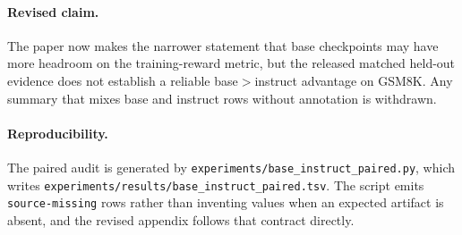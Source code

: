 \paragraph{Revised claim.}
The paper now makes the narrower statement that base checkpoints may have
more headroom on the training-reward metric, but the released matched
held-out evidence does not establish a reliable base$>$instruct advantage on
GSM8K. Any summary that mixes base and instruct rows without annotation is
withdrawn.

\paragraph{Reproducibility.}
The paired audit is generated by
\texttt{experiments/base\_instruct\_paired.py}, which writes
\texttt{experiments/results/base\_instruct\_paired.tsv}. The script emits
\texttt{source-missing} rows rather than inventing values when an expected
artifact is absent, and the revised appendix follows that contract directly.

